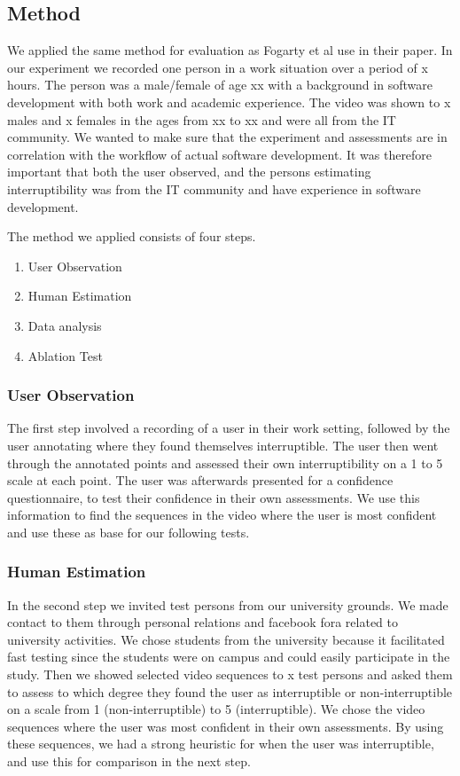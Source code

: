 \documentclass{sigchi}
\begin{document}
\subsection{Method}
We applied the same method for evaluation as Fogarty et al \cite{fogarty2005predicting} use in their paper.
In our experiment we recorded one person in a work situation over a period of x hours.
The person was a male/female of age xx with a background in software development with both work and academic experience.
The video was shown to x males and x females in the ages from xx to xx and were all from the IT community.
We wanted to make sure that the experiment and assessments are in correlation with the workflow of actual software development.
It was therefore important that both the user observed, and the persons estimating interruptibility was from the IT community and have experience in software development.

The method we applied consists of four steps.

\begin{enumerate}
  \item User Observation
  \item Human Estimation
  \item Data analysis
  \item Ablation Test
\end{enumerate}

\subsubsection{User Observation}
The first step involved a recording of a user in their work setting, followed by the user annotating where they found themselves interruptible.
The user then went through the annotated points and assessed their own interruptibility on a 1 to 5 scale at each point.
The user was afterwards presented for a confidence questionnaire, to test their confidence in their own assessments.
We use this information to find the sequences in the video where the user is most confident and use these as base for our following tests.

\subsubsection{Human Estimation}
In the second step we invited test persons from our university grounds. We made contact to them through personal relations and facebook fora related to university activities.
We chose students from the university because it facilitated fast testing since the students were on campus and could easily participate in the study.
Then we showed selected video sequences to x test persons and asked them to assess to which degree they found the user as interruptible or non-interruptible on a scale from 1 (non-interruptible) to 5 (interruptible).
We chose the video sequences where the user was most confident in their own assessments.
By using these sequences, we had a strong heuristic for when the user was interruptible, and use this for comparison in the next step.
\end{document}

